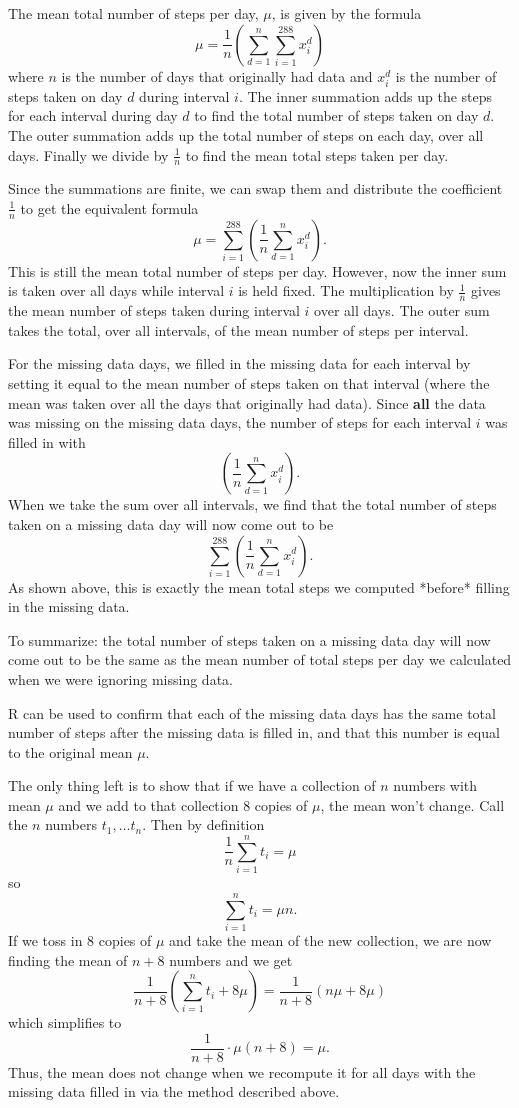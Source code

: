 \documentclass{article}
\begin{document}
The mean total number of steps per day, $\mu$, is given by the formula
$$ \mu=\frac{1}{n} \left(\sum_{d=1}^{n} \sum_{i=1}^{288} x^d_i \right)$$
where $n$ is the number of days that originally had data and $x^d_i$ is the number of steps taken on day $d$ during interval $i$.  The inner summation adds up the steps for each interval during day $d$ to find the total number of steps taken on day $d$. The outer summation adds up the total number of steps on each day, over all days. Finally we divide by $\frac{1}{n}$ to find the mean total steps taken per day.

Since the summations are finite, we can swap them and distribute the coefficient $\frac{1}{n}$ to get the equivalent formula
$$\mu=\sum_{i=1}^{288} \left(\frac{1}{n} \sum_{d=1}^{n} x_i^d\right).$$
This is still the mean total number of steps per day.  However, now the inner sum is taken over all days while interval $i$ is held fixed.  The multiplication by $\frac{1}{n}$ gives the mean number of steps taken during interval $i$ over all days. The outer sum takes the total, over all intervals, of the mean number of steps per interval.

For the missing data days, we filled in the missing data for each interval by setting it equal to the mean number of steps taken on that interval (where the mean was taken over all the days that originally had data). Since 
\textbf{all} the data was missing on the missing data days, the number of steps for each interval $i$ was filled in with 
$$\left(\frac{1}{n} \sum_{d=1}^{n} x_i^d\right).$$
When we take the sum over all intervals, we find that the total number of steps taken on a missing data day will now come out to be
$$\sum_{i=1}^{288} \left(\frac{1}{n} \sum_{d=1}^{n} x_i^d\right).$$
As shown above, this is exactly the mean total steps we computed *before* filling in the missing data.

To summarize: the total number of steps taken on a missing data day will now come out to be the same as the mean number of total steps per day we calculated when we were ignoring missing data.

R can be used to confirm that each of the missing data days  has the same total number of steps after the missing data is filled in, and that this number is equal to the original mean $\mu$.


The only thing left is to show that if we have a collection of $n$ numbers with mean $\mu$ and we add to that collection 8 copies of $\mu$, the mean won't change. Call the $n$ numbers $t_1, \dots t_n$.  Then by definition
$$\frac{1}{n}\sum_{i=1}^n t_i=\mu$$
so
$$\sum_{i=1}^n t_i = \mu n.$$
If we toss in 8 copies of $\mu$ and take the mean of the new collection, we are now finding the mean of $n+8$ numbers and we get
$$\frac{1}{n+8}\left(\sum_{i=1}^n t_i + 8\mu\right) = \frac{1}{n+8}\left(n\mu + 8\mu\right)$$
which simplifies to
$$\frac{1}{n+8}\cdot\mu (n+8) = \mu.$$
Thus, the mean does not change when we recompute it for all days with the missing data filled in via the method described above.
\end{document}
